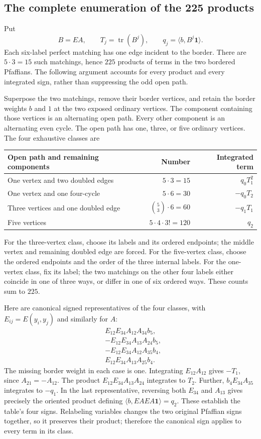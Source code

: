 \documentclass[11pt,letterpaper]{article}
\numberwithin{equation}{section}
\theoremstyle{definition}
\newcommand{\1}{\mathbf 1}
\newcommand{\one}{\mathbf1}
\newcommand{\ip}[2]{\langle #1,#2\rangle}
\DeclareMathOperator{\tr}{tr}
\begin{document}
\subsection{The complete enumeration of the 225 products}
Put
\begin{equation}
 B=EA,\qquad T_j=\tr(B^j),\qquad q_j=\ip b{B^j\one}.
 \label{shr:h5:eq:Tq}
\end{equation}
Each six-label perfect matching has one edge incident to the border.
There are $5\cdot3=15$ such matchings, hence $225$ products of terms in the
two bordered Pfaffians. The following argument accounts for every product
and every integrated sign, rather than suppressing the odd open path.

Superpose the two matchings, remove their border vertices, and retain the
border weights $b$ and $1$ at the two exposed ordinary vertices. The
component containing those vertices is an alternating open path. Every
other component is an alternating even cycle. The open path has one,
three, or five ordinary vertices. The four exhaustive classes are
\begin{center}
\begin{tabular}{@{}lrr@{}}
\toprule
Open path and remaining components&Number&Integrated term\\
\midrule
One vertex and two doubled edges&$5\cdot3=15$&$q_0T_1^2$\\
One vertex and one four-cycle&$5\cdot6=30$&$-q_0T_2$\\
Three vertices and one doubled edge&$\binom53\cdot6=60$&$-q_1T_1$\\
Five vertices&$5\cdot4\cdot3!=120$&$q_2$\\
\bottomrule
\end{tabular}
\end{center}
For the three-vertex class, choose its labels and its ordered endpoints;
the middle vertex and remaining doubled edge are forced. For the
five-vertex class, choose the ordered endpoints and the order of the three
internal labels. For the one-vertex class, fix its label; the two matchings
on the other four labels either coincide in one of three ways, or differ
in one of six ordered ways. These counts sum to $225$.

Here are canonical signed representatives of the four classes, with
$E_{ij}=E(y_i,y_j)$ and similarly for $A$:
\begin{align*}
 &E_{12}E_{34}A_{12}A_{34}b_5,\\
 &-E_{12}E_{34}A_{13}A_{24}b_5,\\
 &-E_{12}E_{34}A_{12}A_{35}b_4,\\
 &E_{12}E_{34}A_{13}A_{25}b_4.
\end{align*}
The missing border weight in each case is one. Integrating
$E_{12}A_{12}$ gives $-T_1$, since $A_{21}=-A_{12}$.
The product $E_{12}E_{34}A_{13}A_{24}$ integrates to $T_2$.
Further, $b_4E_{34}A_{35}$ integrates to $-q_1$.
In the last representative, reversing both $E_{34}$ and $A_{13}$ gives
precisely the oriented product defining $\ip b{EAEA\one}=q_2$.
These establish the table's four signs. Relabeling variables changes the
two original Pfaffian signs together, so it preserves their product;
therefore the canonical sign applies to every term in its class.
\end{document}
